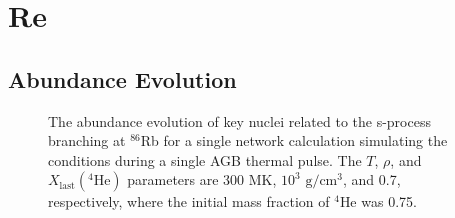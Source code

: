 \section{Re}

\subsection{Abundance Evolution}


\begin{figure}[t]
\caption{\label{fig:abund_evol}The abundance evolution of key nuclei related to the s-process branching at $^{86}$Rb for a single network calculation simulating the conditions during a single AGB thermal pulse. The $T$, $\rho$, and $X_{\mathrm{last}}(^{4}\mathrm{He})$ parameters are 300 MK, $10^{3}$ $\mathrm{g}/\mathrm{cm}^{3}$, and 0.7, respectively, where the initial mass fraction of $^{4}$He was 0.75.}
\end{figure}